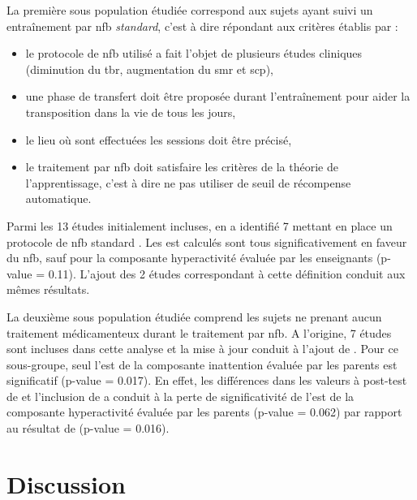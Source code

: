 La première sous population étudiée correspond aux sujets ayant suivi un entraînement par \gls{nfb} \emph{standard}, c'est à dire répondant aux critères établis
par \citet{Arns2014} :
\begin{itemize}
\item le protocole de \gls{nfb} utilisé a fait l'objet de plusieurs études cliniques (diminution du \gls{tbr}, augmentation du \gls{smr} et \gls{scp}),
\item une phase de transfert doit être proposée durant l'entraînement pour aider la transposition dans la vie de tous les jours,
\item le lieu où sont effectuées les sessions doit être précisé,
\item le traitement par \gls{nfb} doit satisfaire les critères de la théorie de l'apprentissage, c'est à dire ne pas utiliser de seuil de récompense automatique.
\end{itemize}

Parmi les 13 études initialement incluses, \citet{Cortese2016} en a identifié 7 mettant en place un protocole de \gls{nfb} standard \citep{Bakhshayesh2011,
Christiansen2014, Gevensleben2009, Beauregard2006, Holtmann2009, Heinrich2004, Linden1996}. 
Les \gls{est} calculés sont tous significativement en faveur du \gls{nfb}, sauf pour la composante hyperactivité évaluée par les enseignants (p-value = 0.11). 
L'ajout des 2 études correspondant à cette définition \citep{Strehl2017, Baumeister2016} conduit aux mêmes résultats. 

La deuxième sous population étudiée comprend les sujets ne prenant aucun traitement médicamenteux durant le traitement par \gls{nfb}. A l'origine, 7 études
sont incluses dans cette analyse \citep{Beauregard2006, Gevensleben2009, Bakhshayesh2011, Arnold2014, Linden1996, Christiansen2014, Maurizio2014} et la 
mise à jour conduit à l'ajout de \citep{Bazanova2018}. Pour ce sous-groupe, seul l'\gls{est} de la composante inattention évaluée par les parents est significatif
(p-value = 0.017). En effet, les différences dans les valeurs à post-test de \citet{Arnold2014} et l'inclusion de \citet{Bazanova2018} a conduit à la perte de 
significativité de l'\gls{est} de la composante hyperactivité évaluée par les parents (p-value = 0.062) par rapport au résultat de \citet{Cortese2016} (p-value 
= 0.016).

\section{Discussion} 


